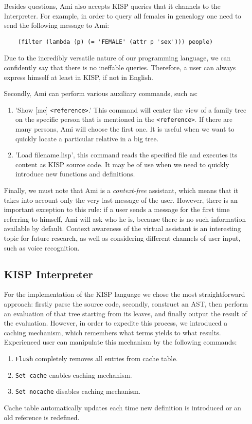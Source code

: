     Besides questions, Ami also accepts KISP queries that it channels to the Interpreter. For example, in order to query
    all females in genealogy one need to send the following message to Ami:
    \begin{verbatim}
    (filter (lambda (p) (= 'FEMALE' (attr p 'sex'))) people)
    \end{verbatim}
    Due to the incredibly versatile nature of our programming language, we can confidently say that there is no ineffable queries.
    Therefore, a user can always express himself at least in KISP, if not in English.

    Secondly, Ami can perform various auxiliary commands, such as:
    \begin{enumerate}
        \item{'Show [me] \texttt{<reference>}.' This command will center the view of a family tree on the specific person that is
            mentioned in the \texttt{<reference>}. If there are many persons, Ami will choose the first one. It is useful when we want
            to quickly locate a particular relative in a big tree.}
        \item{'Load filename.lisp', this command reads the specified file and executes its content as KISP source code. It may be of
            use when we need to quickly introduce new functions and definitions.}
    \end{enumerate}

    Finally, we must note that Ami is a \textit{context-free} assistant, which means that it takes into account only the very last
    message of the user. However, there is an important exception to this rule: if a user sends a message for the first time
    referring to himself, Ami will ask who he is, because there is no such information available by default. Context awareness of the
    virtual assistant is an interesting topic for future research, as well as considering different channels of user input, such as
    voice recognition.

    \subsection{KISP Interpreter}
    For the implementation of the KISP language we chose the most straightforward approach: firstly parse the source code, secondly,
    construct an AST, then perform an evaluation of that tree starting from its leaves, and finally output the result of the
    evaluation. However, in order to expedite this process, we introduced a caching mechanism, which remembers what terms yields to
    what results. Experienced user can manipulate this mechanism by the following commands:
    \begin{enumerate}
        \item{\texttt{Flush} completely removes all entries from cache table.}
        \item{\texttt{Set cache} enables caching mechanism.}
        \item{\texttt{Set nocache} disables caching mechanism.}
    \end{enumerate}
    Cache table automatically updates each time new definition is introduced or an old reference is redefined.

